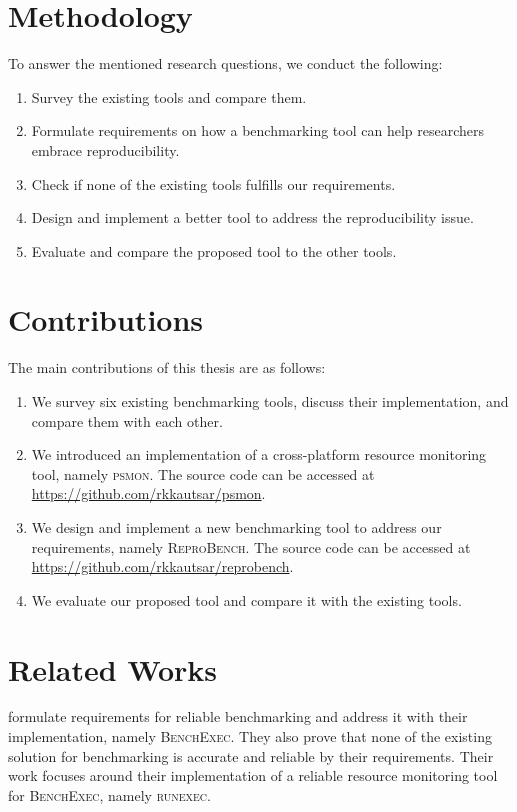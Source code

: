 \section{Methodology}
\label{sec:intro.method}

To answer the mentioned research questions, we conduct the following:
\begin{enumerate}
	\item Survey the existing tools and compare them.
	\item Formulate requirements on how a benchmarking tool can help researchers embrace reproducibility.
	\item Check if none of the existing tools fulfills our requirements.
	\item Design and implement a better tool to address the reproducibility issue.
	\item Evaluate and compare the proposed tool to the other tools.
\end{enumerate}

\section{Contributions}
\label{sec:intro.contributions}

The main contributions of this thesis are as follows:
\begin{enumerate}
	\item We survey six existing benchmarking tools, discuss their implementation, and compare them with each other.
	\item We introduced an implementation of a cross-platform resource monitoring tool, namely \textsc{psmon}. The source code can be accessed at \url{https://github.com/rkkautsar/psmon}.
	\item We design and implement a new benchmarking tool to address our requirements, namely \textsc{ReproBench}. The source code can be accessed at \url{https://github.com/rkkautsar/reprobench}.
	\item We evaluate our proposed tool and compare it with the existing tools.
\end{enumerate}


\section{Related Works}
\label{sec:intro.related}

\citet{beyerReliableBenchmarkingRequirements2019} formulate requirements for reliable benchmarking and address it with their implementation, namely \textsc{BenchExec}.
They also prove that none of the existing solution for benchmarking is accurate and reliable by their requirements.
Their work focuses around their implementation of a reliable resource monitoring tool for \textsc{BenchExec}, namely \textsc{runexec}.

